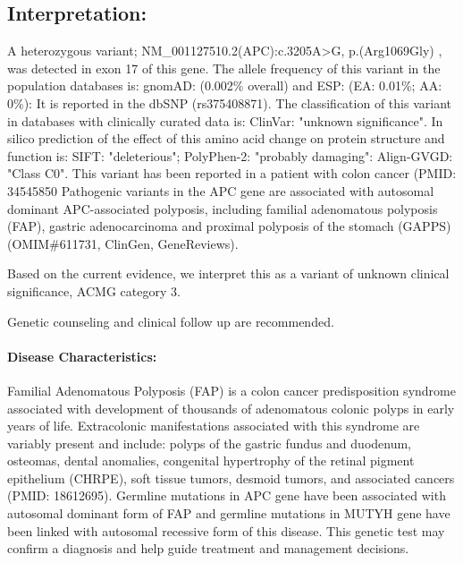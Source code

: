 \documentclass[9pt]{extarticle}
\begin{document}
\subsection*{Interpretation:}
\vspace{-1em}
A heterozygous variant; NM\_001127510.2(APC):c.3205A>G, p.(Arg1069Gly) , was detected in exon 17 of this gene. The allele frequency of this variant in the population databases is: gnomAD: (0.002\% overall) and ESP: (EA: 0.01\%; AA: 0\%): It is reported in the dbSNP (rs375408871). The classification of this variant in databases with clinically curated data is: ClinVar: "unknown significance". In silico prediction of the effect of this amino acid change on protein structure and function is: SIFT: "deleterious"; PolyPhen-2: "probably damaging": Align-GVGD: "Class C0". This variant has been reported in a patient with colon cancer (PMID: 34545850 Pathogenic variants in the APC gene are associated with autosomal dominant APC-associated polyposis, including familial adenomatous polyposis (FAP), gastric adenocarcinoma and proximal polyposis of the stomach (GAPPS) (OMIM\#611731, ClinGen, GeneReviews).

Based on the current evidence, we interpret this as a variant of unknown clinical significance, ACMG category 3.

Genetic counseling and clinical follow up are recommended.

\paragraph{Disease Characteristics:} Familial Adenomatous Polyposis (FAP) is a colon cancer predisposition syndrome associated with development of thousands of adenomatous colonic polyps in early years of life. Extracolonic manifestations associated with this syndrome are variably present and include: polyps of the gastric fundus and duodenum, osteomas, dental anomalies, congenital hypertrophy of the retinal pigment epithelium (CHRPE), soft tissue tumors, desmoid tumors, and associated cancers (PMID: 18612695). Germline mutations in APC gene have been associated with autosomal dominant form of FAP and germline mutations in MUTYH gene have been linked with autosomal recessive form of this disease. This genetic test may confirm a diagnosis and help guide treatment and management decisions.
\end{document}
